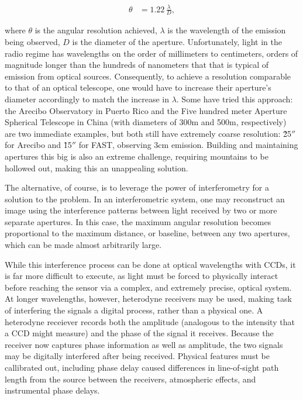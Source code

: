 \begin{align}
  \theta &= 1.22 \, \frac{\lambda}{D},
\end{align}

\noindent where $\theta$ is the angular resolution achieved, $\lambda$ is the wavelength of the emission being observed, $D$ is the diameter of the aperture. Unfortunately, light in the radio regime has wavelengths on the order of millimeters to centimeters, orders of magnitude longer than the hundreds of nanometers that that is typical of emission from optical sources. Consequently, to achieve a resolution comparable to that of an optical telescope, one would have to increase their aperture's diameter accordingly to match the increase in $\lambda$. Some have tried this approach: the Arecibo Observatory in Puerto Rico and the Five hundred meter Aperture Spherical Telescope in China (with diameters of 300m and 500m, respectively) are two immediate examples, but both still have extremely coarse resolution: \~25$''$ for Arecibo and \~15$''$ for FAST, observing 3cm emission. Building and maintaining apertures this big is also an extreme challenge, requiring mountains to be hollowed out, making this an unappealing solution.

The alternative, of course, is to leverage the power of interferometry for a solution to the problem. In an interferometric system, one may reconstruct an image using the interference patterns between light received by two or more separate apertures. In this case, the maximum angular resolution becomes proportional to the maximum distance, or baseline, between any two  apertures, which can be made almost arbitrarily large.

While this interference process can be done at optical wavelengths with CCDs, it is far more difficult to execute, as light must be forced to physically interact before reaching the sensor via a complex, and extremely precise, optical system. At longer wavelengths, however, heterodyne receivers may be used, making task of interfering the signals a digital process, rather than a physical one. A heterodyne receiever records both the amplitude (analogous to the intensity that a CCD might measure) and the phase of the signal it receives. Because the receiver now captures phase information as well as amplitude, the two signals may be digitally interfered after being received. Physical features must be callibrated out, including phase delay caused differences in line-of-sight path length from the source between the receivers, atmospheric effects, and instrumental phase delays.


